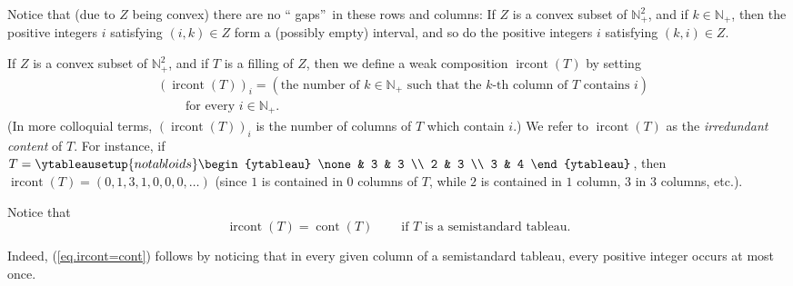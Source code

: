 \documentclass[numbers=enddot,12pt,final,onecolumn,notitlepage]{scrartcl}%
\theoremstyle{definition}
\newenvironment{vershort}{}{}
\begin{document}
Notice that (due to $Z$ being convex) there are no \textquotedblleft
gaps\textquotedblright\ in these rows and columns: If $Z$ is a convex subset
of $\mathbb{N}_{+}^{2}$, and if $k\in\mathbb{N}_{+}$, then the positive
integers $i$ satisfying $\left(  i,k\right)  \in Z$ form a (possibly empty)
interval, and so do the positive integers $i$ satisfying $\left(  k,i\right)
\in Z$.

If $Z$ is a convex subset of $\mathbb{N}_{+}^{2}$, and if $T$ is a filling of
$Z$, then we define a weak composition $\operatorname*{ircont}\left(
T\right)  $ by setting%
\begin{align*}
&  \left(  \operatorname*{ircont}\left(  T\right)  \right)  _{i}=\left(
\text{the number of }k\in\mathbb{N}_{+}\text{ such that the }k\text{-th column
of }T\text{ contains }i\right) \\
&  \ \ \ \ \ \ \ \ \ \ \text{for every }i\in\mathbb{N}_{+}.
\end{align*}
(In more colloquial terms, $\left(  \operatorname*{ircont}\left(  T\right)
\right)  _{i}$ is the number of columns of $T$ which contain $i$.) We refer to
$\operatorname*{ircont}\left(  T\right)  $ as the \textit{irredundant content}
of $T$. For instance, if $T=%
\ytableausetup{notabloids}
\begin{ytableau}
\none& 3 & 3 \\
2 & 3 \\
3 & 4
\end{ytableau}%
$, then $\operatorname*{ircont}\left(  T\right)  =\left(  0,1,3,1,0,0,0,\ldots
\right)  $ (since $1$ is contained in $0$ columns of $T$, while $2$ is
contained in $1$ column, $3$ in $3$ columns, etc.).

Notice that
\begin{equation}
\operatorname*{ircont}\left(  T\right)  =\operatorname*{cont}\left(  T\right)
\ \ \ \ \ \ \ \ \ \ \text{if }T\text{ is a semistandard tableau.}
\label{eq.ircont=cont}%
\end{equation}


\begin{vershort}
Indeed, (\ref{eq.ircont=cont}) follows by noticing that in every given column
of a semistandard tableau, every positive integer occurs at most once.
\end{vershort}
\end{document}
